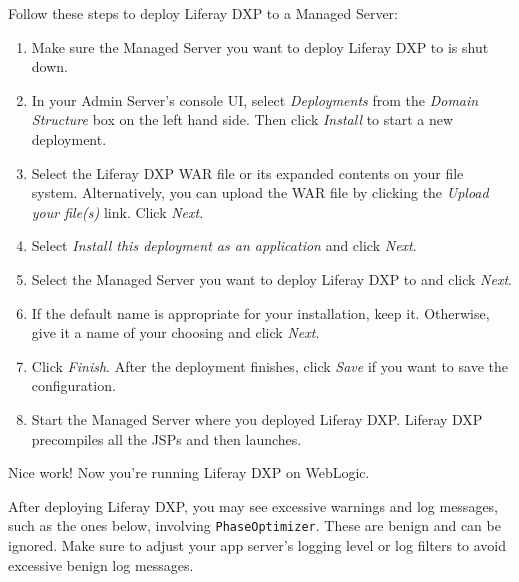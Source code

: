 Follow these steps to deploy Liferay DXP to a Managed Server:

\begin{enumerate}
\def\labelenumi{\arabic{enumi}.}
\item
  Make sure the Managed Server you want to deploy Liferay DXP to is shut
  down.
\item
  In your Admin Server's console UI, select \emph{Deployments} from the
  \emph{Domain Structure} box on the left hand side. Then click
  \emph{Install} to start a new deployment.
\item
  Select the Liferay DXP WAR file or its expanded contents on your file
  system. Alternatively, you can upload the WAR file by clicking the
  \emph{Upload your file(s)} link. Click \emph{Next}.
\item
  Select \emph{Install this deployment as an application} and click
  \emph{Next}.
\item
  Select the Managed Server you want to deploy Liferay DXP to and click
  \emph{Next}.
\item
  If the default name is appropriate for your installation, keep it.
  Otherwise, give it a name of your choosing and click \emph{Next}.
\item
  Click \emph{Finish}. After the deployment finishes, click \emph{Save}
  if you want to save the configuration.
\item
  Start the Managed Server where you deployed Liferay DXP. Liferay DXP
  precompiles all the JSPs and then launches.
\end{enumerate}

Nice work! Now you're running Liferay DXP on WebLogic.

\noindent\hrulefill

After deploying Liferay DXP, you may see excessive warnings and log
messages, such as the ones below, involving \texttt{PhaseOptimizer}.
These are benign and can be ignored. Make sure to adjust your app
server's logging level or log filters to avoid excessive benign log
messages.

